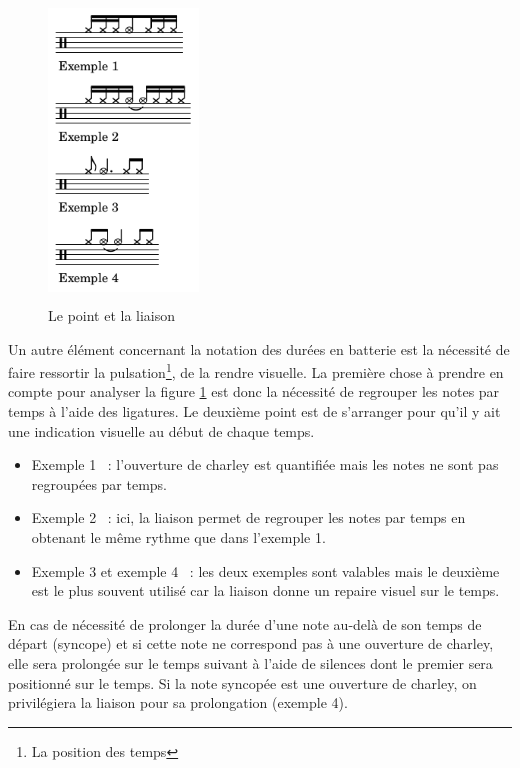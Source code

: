 \begin{figure}[h]
	\centering
	\includegraphics[height=80mm, width=40mm]{
    z_images/3_methodes/0_notation_de_la_batterie/3_point_et_liaison.png}
	\caption{Le point et la liaison}
	\label{point_liaison}
\end{figure}

Un autre élément concernant la notation des durées en batterie est la nécessité
de faire ressortir la pulsation\footnote{La position des temps}, de la rendre
visuelle. La première chose à prendre en compte pour analyser la figure
\ref{point_liaison} est donc la nécessité de regrouper les notes par temps à
l’aide des ligatures. Le deuxième point est de s’arranger pour qu’il y ait une
indication visuelle au début de chaque temps.

\begin{itemize}
    \item Exemple 1~ : l’ouverture de charley est quantifiée mais les notes ne
        sont pas regroupées par temps.
    \item Exemple 2~ : ici, la liaison permet de regrouper les notes par temps
        en obtenant le même rythme que dans l’exemple 1.
    \item Exemple 3 et exemple 4~ : les deux exemples sont valables mais le
        deuxième est le plus souvent utilisé car la liaison donne un repaire
        visuel sur le temps.\\
\end{itemize}

En cas de nécessité de prolonger la durée d’une note au-delà 
de son temps de départ (syncope) et si cette note ne correspond pas à une
ouverture de charley, elle sera prolongée sur le temps suivant à l’aide de
silences dont le premier sera positionné sur le temps. Si la note syncopée est
une ouverture de charley, on privilégiera la liaison pour sa prolongation (exemple 4).

